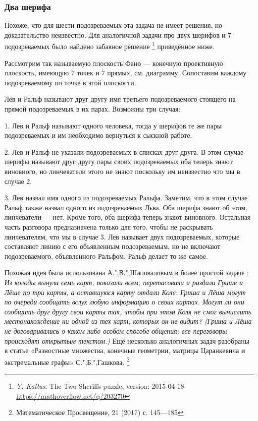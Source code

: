 \documentclass[twoside]{book}
\begin{document}
\subsubsection*{Два шерифа}
Похоже, что для шести подозреваемых эта задача не имеет решения, но доказательство неизвестно.
Для аналогичной задачи про двух шерифов и 7 подозреваемых было найдено забавное решение%
\footnote{\emph{Y. Kallus}. The Two Sheriffs puzzle, version: 2015-04-18 \url{https://mathoverflow.net/q/203270}}
приведённое ниже.

Рассмотрим так называемую плоскость Фано --- конечную проективную плоскость, имеющую 7 точек и 7 прямых, см. диаграмму.
Сопоставим каждому подозреваемому по точке в этой плоскости.

Лев и Ральф называют друг другу имя третьего подозреваемого стоящего на прямой подозреваемых в их парах.
Возможны три случая:

1. Лев и Ральф называют одного человека, тогда у шерифов те же пары подозреваемых и им необходимо вернуться к сыскной работе.

2. Лев и Ральф не указали подозреваемых в списках друг друга.
В этом случае шерифы называют друг другу пары своих подозреваемых оба теперь знают виновного, но линчеватели этого не знают поскольку им неизвестно что мы в случае 2.

3. Лев назвал имя одного из подозреваемых Ральфа.
Заметим, что в этом случае Ральф также назвал одного из подозреваемых Льва.
Оба шерифа знают об этом, линчеватели --- нет.
Кроме того, оба шерифа теперь знают виновного.
Остальная часть разговора предназначена только для того, чтобы не раскрывать линчевателям, что мы в случае 3. Лев называет двух подозреваемых, которые составляют линию с его объявленным подозреваемым, но не включают подозреваемого, объявленного Ральфом.
Ральф делает то же самое.


Похожая идея была использована А.",В.",Шаповаловым в более простой задаче \cite[№ 105089]{problems}: 
\emph{Из колоды вынули семь карт, показали всем, перетасовали и раздали Грише и Лёше
по три карты, а оставшуюся карту отдали Коле.
Гриша и Лёша могут по очереди сообщать вслух любую информацию о своих картах.
Могут ли они сообщить друг другу свои карты так, чтобы при этом Коля не смог
вычислить местонахождение ни одной из тех карт, которых он не видит?
(Гриша и Лёша не договаривались о каком-либо особом способе общения;
все переговоры происходят открытым текстом.)}
Ещё несколько аналогичных задач разобраны в статье «Разностные множества, конечные геометрии, матрицы Царанкевича и экстремальные графы» С.",Б.",Гашкова.%
\footnote{Математическое Просвещение, 21 (2017) с. 145---185}
\end{document}
